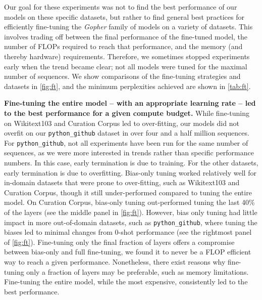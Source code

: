 \documentclass[11pt, a4paper, logo, internal, copyright, nonumbering]{deepmind}
\newcommand{\gopher}{\textit{Gopher}\xspace}
\newcommand{\pygithub}{\texttt{python\_github}\xspace}
\begin{document}
Our goal for these experiments was not to find the best performance of our models on these specific datasets, but rather to find general best practices for efficiently fine-tuning the \gopher family of models on a variety of datasets. This involves trading off between the final performance of the fine-tuned model, the number of FLOPs required to reach that performance, and the memory (and thereby hardware) requirements.
Therefore, we sometimes stopped experiments early when the trend became clear; not all models were tuned for the maximal number of sequences.
We show comparisons of the fine-tuning strategies and datasets in \autoref{fig:ft}, and the minimum perplexities achieved are shown in \autoref{tab:ft}. 

\textbf{Fine-tuning the entire model -- with an appropriate learning rate -- led to the best performance for a given compute budget.}
While fine-tuning on Wikitext103 and Curation Corpus led to over-fitting, our models did not overfit on our \pygithub dataset in over four and a half million sequences.
For \pygithub, not all experiments have been run for the same number of sequences, as we were more interested in trends rather than specific performance numbers. In this case, early termination is due to training. For the other datasets, early termination is due to overfitting. 
Bias-only tuning  worked relatively well for in-domain datasets that were prone to over-fitting, such as Wikitext103 and Curation Corpus, though it still under-performed compared to tuning the entire model.
On Curation Corpus, bias-only tuning out-performed tuning the last 40\% of the layers (see the middle panel in \autoref{fig:ft}). 
However, bias only tuning had little impact in more out-of-domain datasets, such as \pygithub, where tuning the biases led to minimal changes from 0-shot performance (see the rightmost panel of \autoref{fig:ft}).
Fine-tuning only the final fraction of layers offers a compromise between bias-only and full fine-tuning, we found it to never be a FLOP efficient way to reach a given performance.
Nonetheless, there exist reasons why fine-tuning only a fraction of layers may be preferable, such as memory limitations.
Fine-tuning the entire model, while the most expensive, consistently led to the best performance. 
\end{document}
